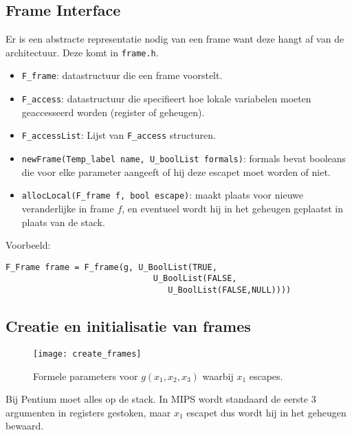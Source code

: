 \subsection{Frame Interface}
Er is een abstracte representatie nodig van een frame want deze hangt af van de architectuur. Deze komt in \texttt{frame.h}.

\begin{itemize}
	\item \texttt{F\_frame}: datastructuur die een frame voorstelt. 
	\item \texttt{F\_access}: datastructuur die specifieert hoe lokale variabelen moeten geaccesseerd worden (register of geheugen).
	\item \texttt{F\_accessList}: Lijst van \texttt{F\_access} structuren.
	\item \texttt{newFrame(Temp\_label name, U\_boolList formals)}: formals bevat booleans die voor elke parameter aangeeft of hij deze escapet moet worden of niet.
	\item \texttt{allocLocal(F\_frame f, bool escape)}: maakt plaats voor nieuwe veranderlijke in frame $f$, en eventueel wordt hij in het geheugen geplaatst in plaats van de stack.
\end{itemize}

Voorbeeld:
\begin{lstlisting}
F_Frame frame = F_frame(g, U_BoolList(TRUE,
                              U_BoolList(FALSE,
                                 U_BoolList(FALSE,NULL))))
\end{lstlisting}
 
\subsection{Creatie en initialisatie van frames}
\begin{figure}
	\texttt{[image: create\_frames]}
	\caption{Formele parameters voor $g(x_1, x_2, x_3)$ waarbij $x_1$ escapes.}
	\label{fig:create_frames}
\end{figure}

Bij Pentium moet alles op de stack. In MIPS wordt standaard de eerste 3 argumenten in registers gestoken, maar $x_1$ escapet dus wordt hij in het geheugen bewaard.
 

